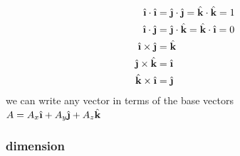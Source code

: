 \documentclass[a4paper,12pt]{article}
\newcommand{\ihat}{\hat{\textbf{\i}}}
\newcommand{\jhat}{\hat{\textbf{\j}}}
\newcommand{\khat}{\hat{\textbf{k}}}
\begin{document}
\begin{characteristic}
\begin{align*}
  \ihat \cdot \ihat &= \jhat \cdot \jhat = \khat \cdot \khat = 1\\
  \ihat \cdot \jhat &= \jhat \cdot \khat = \khat \cdot \ihat = 0\\
  \ihat \times \jhat &= \khat\\
  \jhat \times \khat &= \ihat\\
  \khat \times \ihat &= \jhat
\end{align*}
we can write any vector in terms of the base vectors\\
\(A = A_x\ihat + A_y\jhat + A_z\khat\)\\
\end{characteristic}
\subsubsection{dimension}
\label{sec:orgdef24d1}
\end{document}
